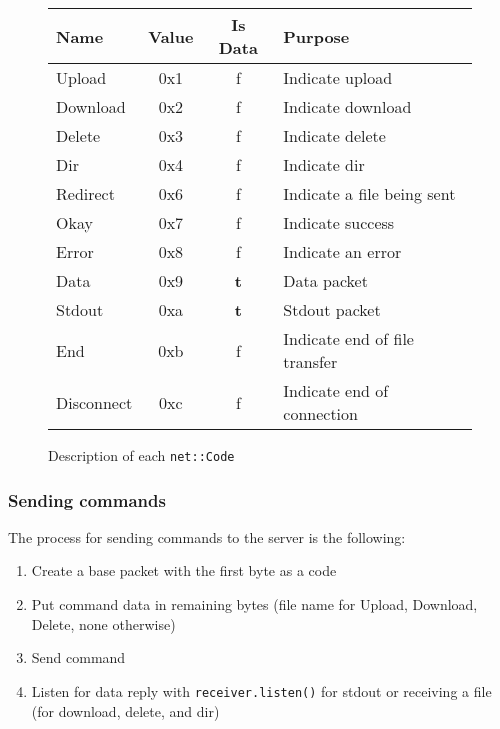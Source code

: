 \documentclass{article}
\begin{document}
\begin{figure}
	\centering
	\begin{tabular}{|l|c|c|l|}
		\hline
		Name & Value & Is Data &Purpose\\\hline
		Upload & 0x1 & f & Indicate upload\\
		Download & 0x2 & f & Indicate download\\
		Delete & 0x3 & f & Indicate delete\\
		Dir & 0x4 & f & Indicate dir\\
		Redirect & 0x6 & f & Indicate a file being sent\\
		Okay & 0x7 & f & Indicate success\\
		Error & 0x8 & f & Indicate an error\\
		\hline
		Data & 0x9 & \textbf{t} & Data packet\\
		Stdout & 0xa & \textbf{t}& Stdout packet\\
		\hline
		End & 0xb & f& Indicate end of file transfer\\
		Disconnect & 0xc & f & Indicate end of connection\\
		\hline
	\end{tabular}
	\label{tbl_code}
	\caption{Description of each \texttt{net::Code}}
\end{figure}

\subsubsection{Sending commands}
The process for sending commands to the server is the following:
\begin{enumerate}
	\item Create a base packet with the first byte as a code
	\item Put command data in remaining bytes (file name for Upload, Download, Delete, none otherwise)
	\item Send command
	\item Listen for data reply with \verb|receiver.listen()| for stdout or receiving a file (for download, delete, and dir)
\end{enumerate}
\end{document}
